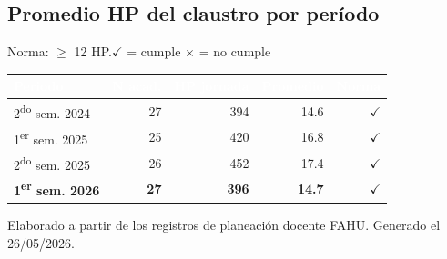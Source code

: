 \documentclass[11pt, a4paper]{article}
\begin{document}
\subsection{Promedio HP del claustro por período}

Norma: $\geq$ 12 HP.\quad$\checkmark$ = cumple \quad $\times$ = no cumple

\begin{tabular}{lrrrr}
\toprule
\rowcolor{usachDark} \textbf{\textcolor{white}{Periodo}} & \textbf{\textcolor{white}{N acad.}} & \textbf{\textcolor{white}{HP jornada}} & \textbf{\textcolor{white}{Promedio}} & \textbf{\textcolor{white}{Norma}} \\
\midrule
2\textsuperscript{do} sem. 2024 & 27 & 394 & 14.6 & $\checkmark$ \\
\rowcolor{rowEven}1\textsuperscript{er} sem. 2025 & 25 & 420 & 16.8 & $\checkmark$ \\
2\textsuperscript{do} sem. 2025 & 26 & 452 & 17.4 & $\checkmark$ \\
\rowcolor{rowHighlight}\textbf{1\textsuperscript{er} sem. 2026} & \textbf{27} & \textbf{396} & \textbf{14.7} & \textbf{$\checkmark$} \\
\bottomrule
\end{tabular}

\vfill
{\footnotesize\color{gray} Elaborado a partir de los registros de planeación docente FAHU. Generado el 26/05/2026.}
\end{document}
